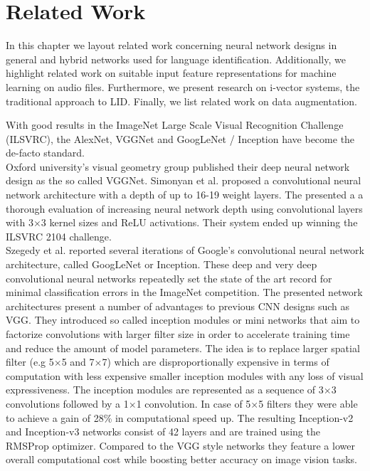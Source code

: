 \section{Related Work}
\label{sec:related_work}
In this chapter we layout related work concerning neural network designs in general and hybrid networks used for language identification. Additionally, we highlight related work on suitable input feature representations for machine learning on audio files. Furthermore, we present research on i-vector systems, the traditional approach to LID. Finally, we list related work on data augmentation. 
	
%	


With good results in the ImageNet Large Scale Visual Recognition Challenge (ILSVRC)\cite{ILSVRC15}, the AlexNet\cite{krizhevsky2012imagenet}, VGGNet\cite{simonyan2014very} and GoogLeNet / Inception\cite{szegedy2015going} have become the de-facto standard.\\ 
Oxford university's visual geometry group published their deep neural network design as the so called VGGNet. Simonyan et al.\cite{simonyan2014very, Chatfield14} proposed a convolutional neural network architecture with a depth of up to 16-19 weight layers. The presented a a thorough evaluation of increasing neural network depth using convolutional layers with 3$\times$3 kernel sizes and ReLU activations. Their system ended up winning the ILSVRC 2104 challenge.\\
Szegedy et al. reported several iterations of Google's convolutional neural network architecture, called GoogLeNet or Inception\cite{szegedy2015going, szegedy2016rethinking, szegedy2016inception}. These deep and very deep convolutional neural networks repeatedly set the state of the art record for minimal classification errors in the ImageNet competition. The presented network architectures present a number of advantages to previous CNN designs such as VGG. They introduced so called inception modules or mini networks that aim to factorize convolutions with larger filter size in order to accelerate training time and reduce the amount of model parameters. The idea is to replace larger spatial filter (e.g 5$\times$5 and 7$\times$7) which are disproportionally expensive in terms of computation with less expensive smaller inception modules with any loss of visual expressiveness. The inception modules are represented as a sequence of 3$\times$3 convolutions followed by a 1$\times$1 convolution. In case of 5$\times$5 filters they were able to achieve a gain of 28\% in computational speed up. The resulting Inception-v2 and Inception-v3 networks consist of 42 layers and are trained using the RMSProp\cite{tieleman2012lecture} optimizer. Compared to the VGG style networks they feature a lower overall computational cost while boosting better accuracy on image vision tasks.

